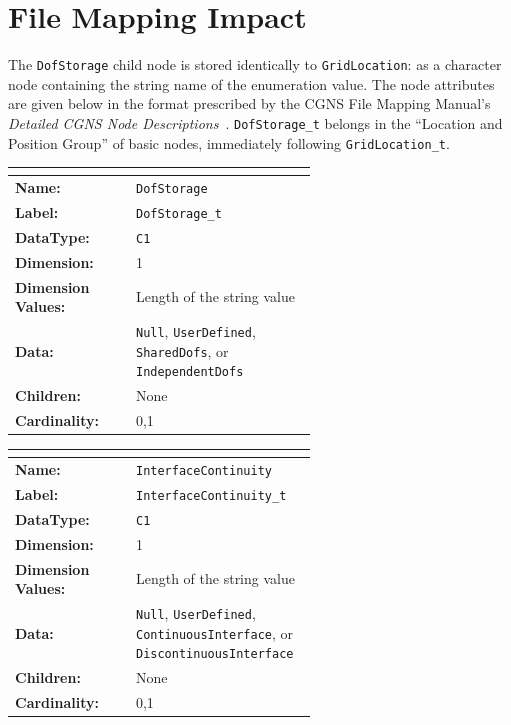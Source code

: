 \documentclass[11pt,letterpaper]{article}
\begin{document}
\section{File Mapping Impact}
\label{sec:filemap-impact}

The \texttt{DofStorage} child node is stored identically
to \texttt{GridLocation}: as a character node containing the string
name of the enumeration value.  The node attributes are given below in
the format prescribed by the CGNS File Mapping Manual's
\emph{Detailed CGNS Node Descriptions}~\cite{cgns-fmm}.
\texttt{DofStorage\_t} belongs in the ``Location and Position Group''
of basic nodes, immediately following \texttt{GridLocation\_t}.

\begin{center}
\begin{tabular}{@{} >{\bfseries}l p{0.60\linewidth} @{}}
\multicolumn{2}{@{}l}{\textbf{Node Attributes:} \texttt{DofStorage\_t}} \\
\toprule
Name: & \texttt{DofStorage} \\
Label: & \texttt{DofStorage\_t} \\
DataType: & \texttt{C1} \\
Dimension: & 1 \\
Dimension Values: & Length of the string value \\
Data: & \texttt{Null}, \texttt{UserDefined}, \texttt{SharedDofs},
        or \texttt{IndependentDofs} \\
Children: & None \\
Cardinality: & 0,1 \\
\bottomrule
\end{tabular}
\end{center}

\begin{center}
\begin{tabular}{@{} >{\bfseries}l p{0.60\linewidth} @{}}
\multicolumn{2}{@{}l}{\textbf{Node Attributes:} \texttt{InterfaceContinuity\_t}} \\
\toprule
Name: & \texttt{InterfaceContinuity} \\
Label: & \texttt{InterfaceContinuity\_t} \\
DataType: & \texttt{C1} \\
Dimension: & 1 \\
Dimension Values: & Length of the string value \\
Data: & \texttt{Null}, \texttt{UserDefined},
        \texttt{ContinuousInterface}, or
        \texttt{DiscontinuousInterface} \\
Children: & None \\
Cardinality: & 0,1 \\
\bottomrule
\end{tabular}
\end{center}
\end{document}
